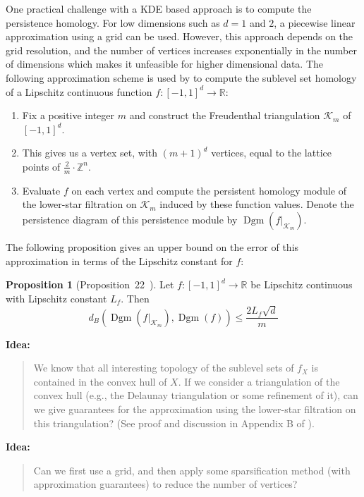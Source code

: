 \documentclass[10pt,a4paper]{article}
\theoremstyle{definition}
\newtheorem{prop}{Proposition}[thm]
\newcommand{\R}{\mathbb{R}}
\newenvironment{idea}{%
	\begin{tcolorbox}[colback=green, breakable, sharp corners]
		\textbf{Idea: }
		\medskip
		\begin{quote}
			\centering
}{\end{quote}\medskip\end{tcolorbox}}
\begin{document}
One practical challenge with a KDE based approach is to compute the persistence homology. For low dimensions such as $d=1$ and $2$, a piecewise linear approximation using a grid can be used. However, this approach depends on the grid resolution, and the number of vertices increases exponentially in the number of dimensions which makes it unfeasible for higher dimensional data. The following approximation scheme is used by \autocite{Hoefgeest2022} to compute the sublevel set homology of a Lipschitz continuous function $f\colon[-1,1]^d\to\R$:
\begin{enumerate}
	\item Fix a positive integer $m$ and construct the Freudenthal triangulation $\mathcal{K}_m$ of $[-1,1]^d$.
	\item This gives us a vertex set, with $(m+1)^d$ vertices, equal to the lattice points of $\frac{2}{m}\cdot\mathbb{Z}^n$.
	\item Evaluate $f$ on each vertex and compute the persistent homology module of the lower-star filtration on $\mathcal{K}_m$ induced by these function values. Denote the persistence diagram of this persistence module by $\operatorname{Dgm}(f\vert_{\mathcal{K}_m})$.
\end{enumerate}
The following proposition gives an upper bound on the error of this approximation in terms of the Lipschitz constant for $f$:
\begin{prop}[Proposition~22~\autocite{Hoefgeest2022}]
	Let $f\colon[-1,1]^d\to\R$ be Lipschitz continuous with Lipschitz constant $L_f$. Then
	$$
	d_B\left(\operatorname{Dgm}(f\vert_{\mathcal{K}_m}), \operatorname{Dgm}(f)\right)\leq \frac{2L_f\sqrt{d}}{m}
	$$
\end{prop}

\begin{idea}
	We know that all interesting topology of the sublevel sets of $f_X$ is contained in the convex hull of $X$. If we consider a triangulation of the convex hull (e.g., the Delaunay triangulation or some refinement of it), can we give guarantees for the approximation using the lower-star filtration on this triangulation? (See proof and discussion in Appendix B of \autocite{Hoefgeest2022}).
\end{idea}

\begin{idea}
	Can we first use a grid, and then apply some sparsification method (with approximation guarantees) to reduce the number of vertices?
\end{idea}

\printbibliography
\end{document}
